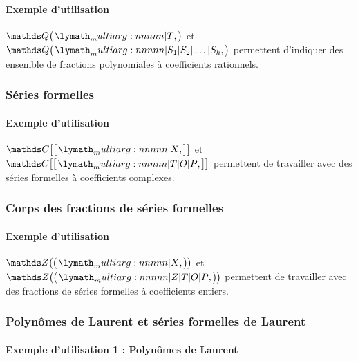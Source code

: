 \documentclass[12pt,a4paper]{scrartcl}
\theoremstyle{definition}
\begin{document}
            \paragraph{Exemple d'utilisation}

\begin{tcblisting}{}
$\polyfracset{\QQ}{T}$ et $\polyfracset{\QQ}{S_1 | S_2 | \dots | S_k}$ permettent 
d'indiquer des ensemble de fractions polynomiales à coefficients rationnels.
\end{tcblisting}



        \subsubsection{Séries formelles}

            \paragraph{Exemple d'utilisation}

\begin{tcblisting}{}
$\serieset{\CC}{X}$ et $\serieset{\CC}{T | O | P}$ permettent de travailler avec des
séries formelles à coefficients complexes.
\end{tcblisting}



        \subsubsection{Corps des fractions de séries formelles}

            \paragraph{Exemple d'utilisation}

\begin{tcblisting}{}
$\seriefracset{\ZZ}{X}$ et $\seriefracset{\ZZ}{Z | T | O | P}$ permettent de travailler
avec des fractions de séries formelles à coefficients entiers.
\end{tcblisting}



        \subsubsection{Polynômes de Laurent et séries formelles de Laurent}

            \paragraph{Exemple d'utilisation 1 : Polynômes de Laurent}
\end{document}
